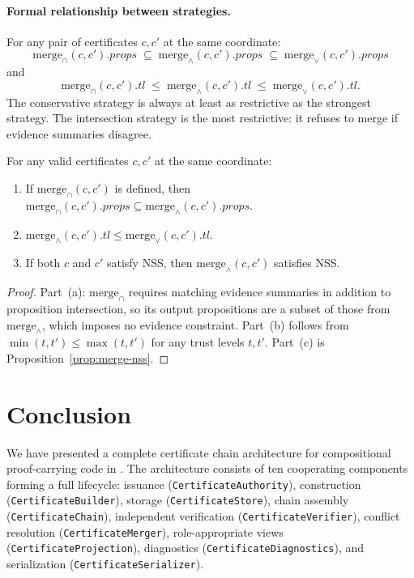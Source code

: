 \documentclass[11pt]{article}
\newcommand{\certprops}{\mathit{props}}        %
\newcommand{\certtrust}{\mathit{tl}}           %
\renewcommand{\merge}{\mathrm{merge}}            %
\begin{document}
\paragraph{Formal relationship between strategies.}
For any pair of certificates $c, c'$ at the same coordinate:
\[
  \merge_{\cap}(c, c').\certprops
  \;\subseteq\; \merge_{\wedge}(c, c').\certprops
  \;\subseteq\; \merge_{\vee}(c, c').\certprops
\]
and
\[
  \merge_{\cap}(c, c').\certtrust
  \;\le\; \merge_{\wedge}(c, c').\certtrust
  \;\le\; \merge_{\vee}(c, c').\certtrust.
\]
The conservative strategy is always at least as restrictive as the
strongest strategy.  The intersection strategy is the most restrictive:
it refuses to merge if evidence summaries disagree.

\begin{proposition}\label{prop:strategy-order}
For any valid certificates $c, c'$ at the same coordinate:
\begin{enumerate}[label=(\alph*)]
  \item If $\merge_{\cap}(c, c')$ is defined, then
        $\merge_{\cap}(c, c').\certprops \subseteq \merge_{\wedge}(c, c').\certprops$.
  \item $\merge_{\wedge}(c, c').\certtrust \le \merge_{\vee}(c, c').\certtrust$.
  \item If both $c$ and $c'$ satisfy NSS, then $\merge_{\wedge}(c, c')$ satisfies NSS.
\end{enumerate}
\end{proposition}
\begin{proof}
Part~(a): $\merge_{\cap}$ requires matching evidence summaries in
addition to proposition intersection, so its output propositions are
a subset of those from $\merge_{\wedge}$, which imposes no evidence
constraint.
Part~(b) follows from $\min(t, t') \le \max(t, t')$ for any trust
levels $t, t'$.
Part~(c) is Proposition~\ref{prop:merge-nss}.
\end{proof}

\section{Conclusion}\label{sec:conclusion}

We have presented a complete certificate chain architecture for
compositional proof-carrying code in \JuGeo{}.
The architecture consists of ten cooperating components forming a full
lifecycle: issuance (\texttt{CertificateAuthority}), construction
(\texttt{CertificateBuilder}), storage (\texttt{CertificateStore}),
chain assembly (\texttt{CertificateChain}), independent verification
(\texttt{CertificateVerifier}), conflict resolution
(\texttt{CertificateMerger}), role-appropriate views
(\texttt{CertificateProjection}), diagnostics
(\texttt{CertificateDiagnostics}), and serialization
(\texttt{CertificateSerializer}).
\end{document}
